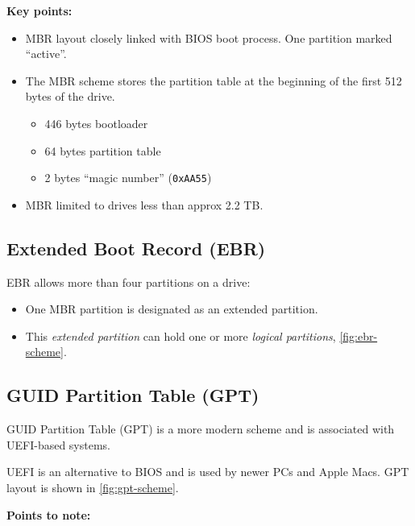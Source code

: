 \documentclass[slides]{pgnotes}
\begin{document}

\textbf{Key points:} 

\begin{itemize}
\item
  MBR layout closely linked with BIOS boot process. One partition marked
  ``active''.
\item
  The MBR scheme stores the partition table at the beginning of the
  first 512 bytes of the drive.

  \begin{itemize}
  \item 446 bytes bootloader
  \item 64 bytes partition table
  \item 2 bytes ``magic number'' (\texttt{0xAA55})
  \end{itemize}
\item
  MBR limited to drives less than approx 2.2 TB.
\end{itemize}

\subsection{Extended Boot Record (EBR)}
\label{sec:extended-boot-record}

EBR allows more than four partitions on a drive:
\begin{itemize}
\item One MBR partition is designated as an extended partition.
\item This \emph{extended partition} can hold one or more \emph{logical partitions}, \autoref{fig:ebr-scheme}.
\end{itemize}


\subsection{GUID Partition Table (GPT)}
\label{sec:guid-partition-table}

GUID Partition Table (GPT) is a more modern scheme and is associated with UEFI-based systems.

UEFI is an alternative to BIOS and is used by newer PCs and Apple Macs.
GPT layout is shown in \autoref{fig:gpt-scheme}.


\textbf{Points to note:}
\end{document}
